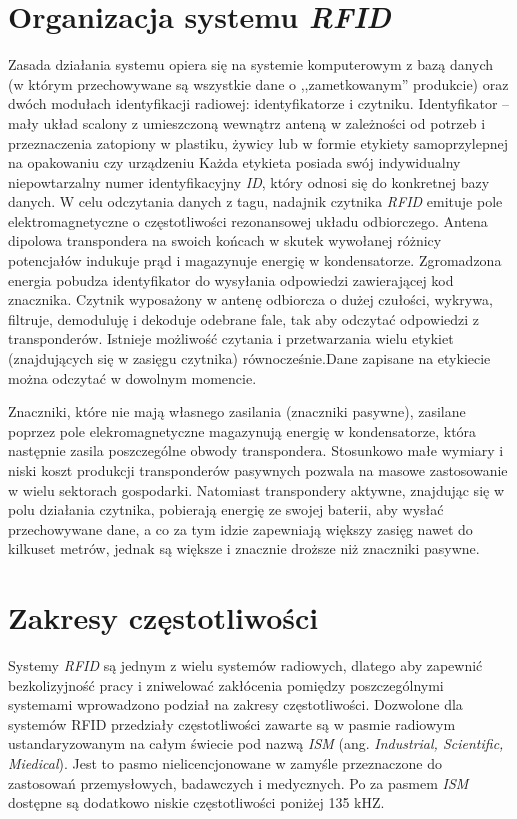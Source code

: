 \begin{itemize}
\begin{itemize}
\section{Organizacja systemu \emph{RFID}}

Zasada działania systemu opiera się na systemie komputerowym z bazą danych (w którym przechowywane  są wszystkie dane o ,,zametkowanym” produkcie)  oraz dwóch modułach identyfikacji radiowej: identyfikatorze i czytniku. Identyfikator – mały układ scalony z umieszczoną wewnątrz anteną w zależności od potrzeb i przeznaczenia zatopiony w plastiku, żywicy lub w formie etykiety samoprzylepnej na opakowaniu czy urządzeniu Każda etykieta posiada swój indywidualny niepowtarzalny numer identyfikacyjny \emph{ID}, który odnosi się do konkretnej bazy danych. W celu odczytania danych z tagu, nadajnik czytnika \emph{RFID} emituje pole elektromagnetyczne o częstotliwości rezonansowej układu odbiorczego. Antena dipolowa transpondera na  swoich końcach w skutek wywołanej różnicy  potencjałów indukuje prąd i magazynuje energię w kondensatorze.  Zgromadzona energia pobudza identyfikator do wysyłania odpowiedzi zawierającej kod znacznika. 
Czytnik wyposażony w antenę odbiorcza o dużej czułości, wykrywa, filtruje, demoduluję i dekoduje odebrane fale, tak aby odczytać odpowiedzi z transponderów.
Istnieje możliwość czytania i przetwarzania wielu etykiet (znajdujących się w zasięgu czytnika) równocześnie.Dane zapisane na etykiecie można odczytać w dowolnym momencie. 

Znaczniki, które nie  mają własnego zasilania (znaczniki pasywne), zasilane poprzez pole elekromagnetyczne magazynują energię w kondensatorze, która następnie zasila poszczególne obwody transpondera. Stosunkowo małe wymiary i niski koszt  produkcji transponderów pasywnych pozwala na masowe zastosowanie w wielu sektorach gospodarki. Natomiast transpondery aktywne, znajdując się w polu działania czytnika, pobierają energię ze swojej baterii, aby wysłać przechowywane dane, a co za tym idzie zapewniają większy zasięg nawet do kilkuset metrów, jednak są większe i znacznie droższe niż znaczniki pasywne.

\newpage

\section{Zakresy częstotliwości}

Systemy \emph{RFID} są jednym z wielu systemów radiowych, dlatego aby zapewnić bezkolizyjność pracy i zniwelować zakłócenia pomiędzy poszczególnymi systemami wprowadzono podział na zakresy częstotliwości.  Dozwolone dla systemów RFID przedziały częstotliwości zawarte są w pasmie radiowym ustandaryzowanym na całym świecie pod nazwą \emph{ISM} (ang. \emph{Industrial, Scientific, Miedical}). Jest to pasmo nielicencjonowane w zamyśle przeznaczone do zastosowań przemysłowych, badawczych i medycznych. Po za pasmem \emph{ISM} dostępne są dodatkowo niskie częstotliwości poniżej 135 kHZ.


\end{itemize}
\end{itemize}
